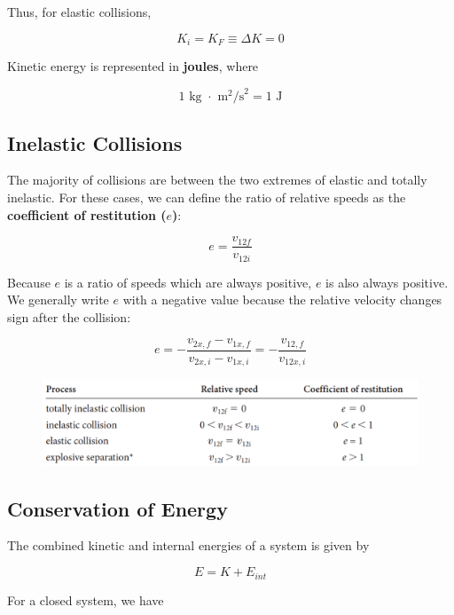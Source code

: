         Thus, for elastic collisions,

        \[
           K_i = K_F \equiv \Delta K = 0
        \]

        Kinetic energy is represented in \textbf{joules}, where

        \[
            1 \text{ kg } \cdot \text{ m}^2\text{/s}^2 = 1 \text{ J}
        \]



    \subsection{Inelastic Collisions}

        The majority of collisions are between the two extremes of elastic and totally inelastic. For these cases, we can define the ratio of relative speeds as the \textbf{coefficient of restitution ($e$)}:

        \[
            e = \frac{v_{12f}}{v_{12i}}
        \]

        Because $e$ is a ratio of speeds which are always positive, $e$ is also always positive. We generally write $e$ with a negative value because the relative velocity changes sign after the collision:

        \[
            e = - \frac{v_{2x,f} - v_{1x,f}}{v_{2x,i} - v_{1x,i}} = - \frac{v_{12,f}}{v_{12x,i}}
        \]

        \begin{figure}[hbt!]
            \centering
            \includegraphics[scale=0.75]{Resources/Coeff_Of_Restitution}
        \end{figure}



    \subsection{Conservation of Energy}

        The combined kinetic and internal energies of a system is given by

        \[
            E = K + E_{int}
        \]

        For a closed system, we have

